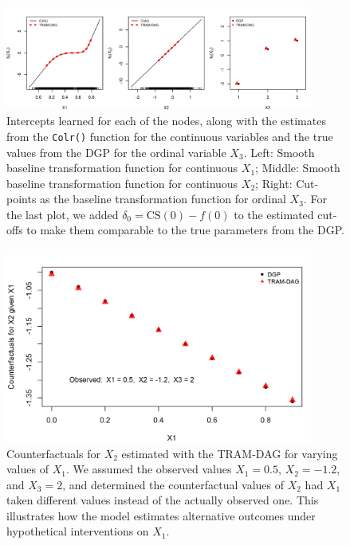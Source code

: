 \begin{figure}[htbp]
\centering
\includegraphics[width=0.9\textwidth]{img/exp1_baseline_trafo.png}
\caption{Intercepts learned for each of the nodes, along with the estimates from the \texttt{Colr()} function for the continuous variables and the true values from the DGP for the ordinal variable $X_3$. Left: Smooth baseline transformation function for continuous $X_1$; Middle: Smooth baseline transformation function for continuous $X_2$; Right: Cut-points as the baseline transformation function for ordinal $X_3$. For the last plot, we added $\delta_0 = \text{CS}(0) - f(0)$ to the estimated cut-offs to make them comparable to the true parameters from the DGP.}
\label{fig:exp1_intercepts}
\end{figure}




\begin{figure}[htbp]
\centering
\includegraphics[width=0.9\textwidth]{img/exp1_counterfactuals.png}

\caption{Counterfactuals for $X_2$ estimated with the TRAM-DAG for varying values of $X_1$. We assumed the observed values $X_1 = 0.5$, $X_2 = -1.2$, and $X_3 = 2$, and determined the counterfactual values of $X_2$ had $X_1$ taken different values instead of the actually observed one. This illustrates how the model estimates alternative outcomes under hypothetical interventions on $X_1$.}
\label{fig:exp1_counterfactuals}
\end{figure}


